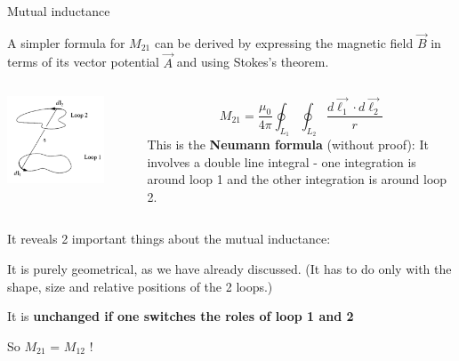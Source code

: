 %
%
%

\begin{frame}{Mutual inductance}

A simpler formula for $M_{21}$ can be derived by expressing the magnetic field
$\vec{B}$ in terms of its vector potential $\vec{A}$ and using Stokes's theorem.

\vspace{0.2cm}

\begin{columns}
  \begin{column}{0.40\textwidth}
    \begin{center}
       \includegraphics[width=0.80\textwidth]{./images/schematics/mutual_inductance_2.png}\\
     \end{center}
  \end{column}
  \begin{column}{0.60\textwidth}
    \begin{equation*}
      M_{21}  =  \frac{\mu_0}{4\pi} \oint_{L_1} \oint_{L_2} \frac{d\vec{\ell_1} \cdot d\vec{\ell_2}}{r}
    \end{equation*}
     This is the {\bf Neumann formula} (without proof):
     It involves a double line integral - one integration is around loop 1 and the other integration is around loop 2.
  \end{column}
\end{columns}

It reveals 2 important things about the mutual inductance:
\begin{itemize}
{\small
   \item It is purely geometrical, as we have already discussed.
            (It has to do only with the shape, size and relative positions of the 2 loops.)
   \item It is {\bf unchanged if one switches the roles of loop 1 and 2}
       \begin{itemize}
       {\small
             \item So $M_{21}$ = $M_{12}$ !
       }
       \end{itemize}
}
\end{itemize}

\end{frame}

